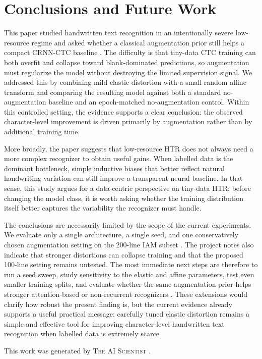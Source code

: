 \documentclass{article} %
\begin{document}
\section{Conclusions and Future Work}
\label{sec:conclusion}
This paper studied handwritten text recognition in an intentionally severe low-resource regime and asked whether a classical augmentation prior still helps a compact CRNN-CTC baseline \citep{shi2016crnn,graves2006ctc}. The difficulty is that tiny-data CTC training can both overfit and collapse toward blank-dominated predictions, so augmentation must regularize the model without destroying the limited supervision signal. We addressed this by combining mild elastic distortion with a small random affine transform and comparing the resulting model against both a standard no-augmentation baseline and an epoch-matched no-augmentation control. Within this controlled setting, the evidence supports a clear conclusion: the observed character-level improvement is driven primarily by augmentation rather than by additional training time.

More broadly, the paper suggests that low-resource HTR does not always need a more complex recognizer to obtain useful gains. When labelled data is the dominant bottleneck, simple inductive biases that better reflect natural handwriting variation can still improve a transparent neural baseline. In that sense, this study argues for a data-centric perspective on tiny-data HTR: before changing the model class, it is worth asking whether the training distribution itself better captures the variability the recognizer must handle.

The conclusions are necessarily limited by the scope of the current experiments. We evaluate only a single architecture, a single seed, and one conservatively chosen augmentation setting on the 200-line IAM subset \citep{marti2002iam}. The project notes also indicate that stronger distortions can collapse training and that the proposed 100-line setting remains untested. The most immediate next steps are therefore to run a seed sweep, study sensitivity to the elastic and affine parameters, test even smaller training splits, and evaluate whether the same augmentation prior helps stronger attention-based or non-recurrent recognizers \citep{michael2019evaluating,kang2022pay}. These extensions would clarify how robust the present finding is, but the current evidence already supports a useful practical message: carefully tuned elastic distortion remains a simple and effective tool for improving character-level handwritten text recognition when labelled data is extremely scarce.

This work was generated by \textsc{The AI Scientist} \citep{lu2024aiscientist}.



\end{document}

